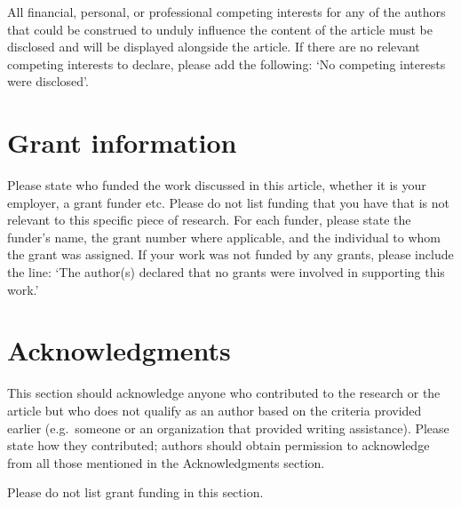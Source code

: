 \documentclass[9pt,a4paper,]{extarticle}
\begin{document}
All financial, personal, or professional competing interests for any of the authors that could be construed to unduly influence the content of the article must be disclosed and will be displayed alongside the article. If there are no relevant competing interests to declare, please add the following: `No competing interests were disclosed'.

\hypertarget{grant-information}{%
\section{Grant information}\label{grant-information}}

Please state who funded the work discussed in this article, whether it is your employer, a grant funder etc. Please do not list funding that you have that is not relevant to this specific piece of research. For each funder, please state the funder's name, the grant number where applicable, and the individual to whom the grant was assigned. If your work was not funded by any grants, please include the line: `The author(s) declared that no grants were involved in supporting this work.'

\hypertarget{acknowledgments}{%
\section{Acknowledgments}\label{acknowledgments}}

This section should acknowledge anyone who contributed to the research or the article but who does not qualify as an author based on the criteria provided earlier (e.g.~someone or an organization that provided writing assistance). Please state how they contributed; authors should obtain permission to acknowledge from all those mentioned in the Acknowledgments section.

Please do not list grant funding in this section.

{\small}
\end{document}
